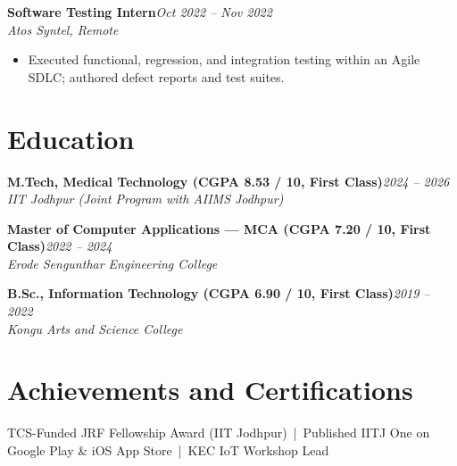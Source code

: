 \documentclass[9.2pt,a4paper]{article}
\newcommand{\role}[3]{\textbf{#1}\hfill\textit{#2}\\[-2pt]\textit{\small #3}\par}
\begin{document}
\role{Software Testing Intern}{Oct 2022 -- Nov 2022}{Atos Syntel, Remote}
\begin{itemize}
  \item Executed functional, regression, and integration testing within an Agile SDLC; authored defect reports and test suites.
\end{itemize}

\section{Education}
\role{M.Tech, Medical Technology (CGPA 8.53 / 10, First Class)}{2024 -- 2026}{IIT Jodhpur (Joint Program with AIIMS Jodhpur)}
\role{Master of Computer Applications --- MCA (CGPA 7.20 / 10, First Class)}{2022 -- 2024}{Erode Sengunthar Engineering College}
\role{B.Sc., Information Technology (CGPA 6.90 / 10, First Class)}{2019 -- 2022}{Kongu Arts and Science College}

\section{Achievements and Certifications}
TCS-Funded JRF Fellowship Award (IIT Jodhpur) \,|\, Published IITJ One on Google Play \& iOS App Store \,|\, KEC IoT Workshop Lead
\end{document}
